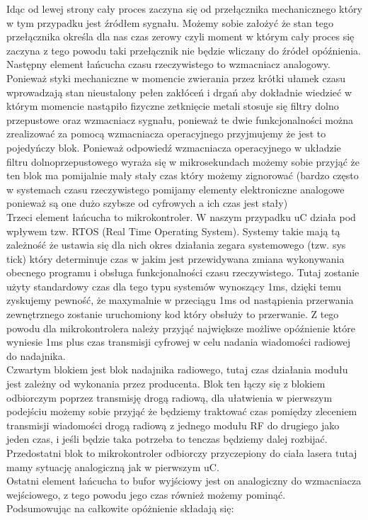 Idąc od lewej strony cały proces zaczyna się od przełącznika mechanicznego który w tym przypadku jest źródłem sygnału. Możemy sobie założyć że stan tego przełącznika określa dla nas czas zerowy czyli moment w którym cały proces się zaczyna z tego powodu taki przełącznik nie będzie wliczany do źródeł opóźnienia.\\
Następny element łańcucha czasu rzeczywistego to wzmacniacz analogowy. Ponieważ styki mechaniczne w momencie zwierania przez krótki ułamek czasu wprowadzają stan nieustalony pełen zakłóceń i drgań aby dokładnie wiedzieć w którym momencie nastąpiło fizyczne zetknięcie metali stosuje się filtry dolno przepustowe oraz wzmacniacz sygnału, ponieważ te dwie funkcjonalności można zrealizować za pomocą wzmacniacza operacyjnego przyjmujemy że jest to pojedyńczy blok. Ponieważ odpowiedź wzmacniacza operacyjnego w układzie filtru dolnoprzepustowego wyraża się w mikrosekundach możemy sobie przyjąć że ten blok ma pomijalnie mały stały czas który możemy zignorować (bardzo często w systemach czasu rzeczywistego pomijamy elementy elektroniczne analogowe ponieważ są one dużo szybsze od cyfrowych a ich czas jest stały) \\
Trzeci element łańcucha to mikrokontroler. W naszym przypadku uC działa pod wpływem tzw. RTOS (Real Time Operating System). Systemy takie mają tą zależność że ustawia się dla nich okres działania zegara systemowego (tzw. sys tick) który determinuje czas w jakim jest przewidywana zmiana wykonywania obecnego programu i obsługa funkcjonalności czasu rzeczywistego. Tutaj zostanie użyty standardowy czas dla tego typu systemów wynoszący 1ms, dzięki temu zyskujemy pewność, że maxymalnie w przeciągu 1ms od nastąpienia przerwania zewnętrznego zostanie uruchomiony kod który obsłuży to przerwanie. Z tego powodu dla mikrokontrolera należy przyjąć największe możliwe opóźnienie które wyniesie 1ms plus czas transmisji cyfrowej w celu nadania wiadomości radiowej do nadajnika.\\
Czwartym blokiem jest blok nadajnika radiowego, tutaj czas działania modułu jest zależny od wykonania przez producenta.
Blok ten łączy się z blokiem odbiorczym poprzez transmisję drogą radiową, dla ułatwienia w pierwszym podejściu możemy sobie przyjąć że będziemy traktować czas pomiędzy zleceniem transmisji wiadomości drogą radiową z jednego modułu RF do drugiego jako jeden czas, i jeśli będzie taka potrzeba to tenczas będziemy dalej rozbijać. \\
Przedostatni blok to mikrokontroler odbiorczy przyczepiony do ciała lasera tutaj mamy sytuację analogiczną jak w pierwszym uC.\\
Ostatni element łańcucha to bufor wyjściowy jest on analogiczny do wzmacniacza wejściowego, z tego powodu jego czas również możemy pominąć. \\
Podsumowując na całkowite opóżnienie składają się: \\

